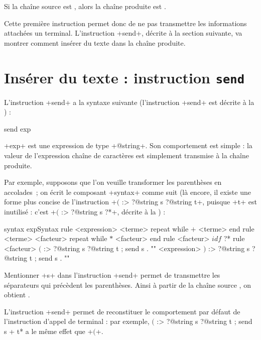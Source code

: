 Si la chaîne source est , alors la chaîne produite est .

Cette première instruction permet donc de ne pas transmettre les informations attachées un terminal. L'instruction \ggst+send+, décrite à la section suivante, va montrer comment insérer du texte dans la chaîne produite.










\section{Insérer du texte : instruction \texttt{send}}

L'instruction \ggst+send+ a la syntaxe suivante (l'instruction \ggst+send+ est décrite à la ) :

\begin{galgas3}
send exp
\end{galgas3}

\ggst+exp+ est une expression de type \ggst+@string+. Son comportement est simple : la valeur de l'expression chaîne de caractères est simplement transmise à la chaîne produite.

Par exemple, supposons que l'on veuille transformer les parenthèses en accolades~; on écrit le composant \ggst+syntax+ comme suit (là encore, il existe une forme plus concise de l'instruction \ggst+$($ :> ?@string s ?@string t+, puisque \ggst+t+ est inutilisé : c'est \ggst+$($ :> ?@string s ?*+, décrite  à la ) :
\begin{galgas3}
syntax expSyntax {
  rule <expression> {
    <terme>
    repeat while $+$ <terme> end
  }
  rule <terme> {
    <facteur>
    repeat while $*$ <facteur> end
  }
  rule <facteur> {
    $idf$ ?*
  }
  rule <facteur> {
    $($ :> ?@string s ?@string t ; send s . "{"
    <expression>
    $)$ :> ?@string s ?@string t ; send s . "}"
  }
}
\end{galgas3}

Mentionner \ggst+s+ dans l'instruction \ggst+send+ permet de transmettre les séparateurs qui précèdent les parenthèses. Ainsi à partir de la chaîne source , on obtient .


L'instruction \ggst+send+ permet de reconstituer le comportement par défaut de l'instruction d'appel de terminal : par exemple, \ggst*$($ :> ?@string s ?@string t ; send s + t* a le même effet que \ggst+$($+.



